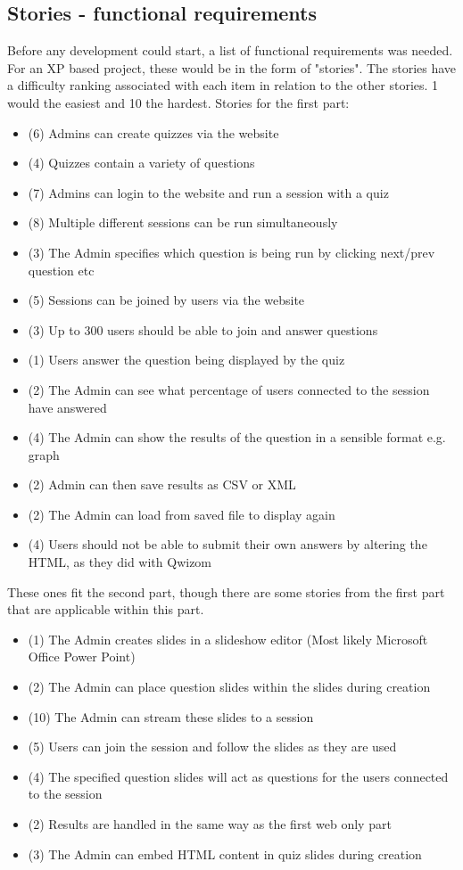 \subsection{Stories - functional requirements}
Before any development could start, a list of functional requirements was needed. For an XP based project, these would be in the form of "stories". The stories have a difficulty ranking associated with each item in relation to the other stories. 1 would the easiest and 10 the hardest.
Stories for the first part:
\begin{itemize}
	\item (6) Admins can create quizzes via the website
	\item (4) Quizzes contain a variety of questions
	\item (7) Admins can login to the website and run a session with a quiz
	\item (8) Multiple different sessions can be run simultaneously
	\item (3) The Admin specifies which question is being run by clicking next/prev question etc
	\item (5) Sessions can be joined by users via the website
	\item (3) Up to 300 users should be able to join and answer questions
	\item (1) Users answer the question being displayed by the quiz
	\item (2) The Admin can see what percentage of users connected to the session have answered
	\item (4) The Admin can show the results of the question in a sensible format e.g. graph
	\item (2) Admin can then save results as CSV or XML
	\item (2) The Admin can load from saved file to display again
	\item (4) Users should not be able to submit their own answers by altering the HTML, as they did with Qwizom
\end{itemize}
These ones fit the second part, though there are some stories from the first part that are applicable within this part.
\begin{itemize}
	\item (1) The Admin creates slides in a slideshow editor (Most likely Microsoft Office Power Point)
	\item (2) The Admin can place question slides within the slides during creation
	\item (10) The Admin can stream these slides to a session
	\item (5) Users can join the session and follow the slides as they are used	
	\item (4) The specified question slides will act as questions for the users connected to the session
	\item (2) Results are handled in the same way as the first web only part
	\item (3) The Admin can embed HTML content in quiz slides during creation
\end{itemize}

